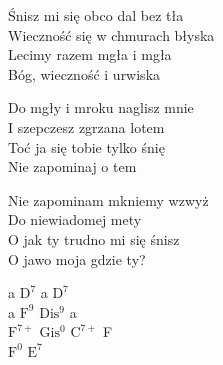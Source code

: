 \begin{text}
    Śnisz mi się obco dal bez tła\\
    Wieczność się w chmurach błyska\\
    Lecimy razem mgła i mgła\\
    Bóg, wieczność i urwiska

    Do mgły i mroku naglisz mnie\\
    I szepczesz zgrzana lotem\\
    Toć ja się tobie tylko śnię\\
    Nie zapominaj o tem

    Nie zapominam mkniemy wzwyż\\
    Do niewiadomej mety\\
    O jak ty trudno mi się śnisz\\
    O jawo moja gdzie ty?
\end{text}
\begin{chord}
    a $\mathrm{D^{7}}$ a $\mathrm{D^{7}}$\\
    a $\mathrm{F^{9}}$ $\mathrm{Dis^{9}}$ a\\
    $\mathrm{F^{7+}}$ $\mathrm{Gis^{0}}$ $\mathrm{C^{7+}}$ F\\
    $\mathrm{F^{0}}$ $\mathrm{E^{7}}$

    \\
\end{chord}
